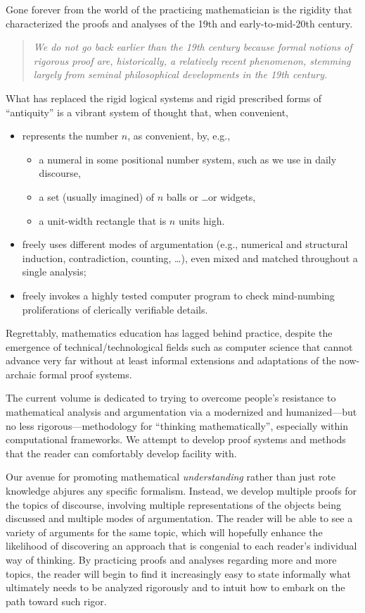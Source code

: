 Gone forever from the world of the practicing mathematician is the
rigidity that characterized the proofs and analyses of the 19th and
early-to-mid-20th century.
\begin{quote}
{\em We do not go back earlier than the 19th century because
formal notions of rigorous proof are, historically, a relatively
recent phenomenon, stemming largely from seminal philosophical
developments in the 19th century.}
\end{quote}
What has replaced the rigid logical systems and rigid prescribed forms
of ``antiquity'' is a vibrant system of thought that, when convenient,
\begin{itemize}
\item
represents the  number $n$, as convenient, by, e.g.,
  \begin{itemize}
  \item
a numeral in some positional number system, such as we use in daily
discourse,
  \item
a set (usually imagined) of $n$ balls or \ldots or widgets,
  \item
a unit-width rectangle that is $n$ units high.
  \end{itemize}

\item
freely uses different modes of argumentation (e.g., numerical and
structural induction, contradiction, counting, \ldots), even mixed and
matched throughout a single analysis;

\item
freely invokes a highly tested computer program to check mind-numbing
proliferations of clerically verifiable details.
\end{itemize}

Regrettably, mathematics education has lagged behind practice, despite
the emergence of technical/technological fields such as computer
science that cannot advance very far without at least informal
extensions and adaptations of the now-archaic formal proof systems.

The current volume is dedicated to trying to overcome people's
resistance to mathematical analysis and argumentation via a modernized
and humanized---but no less rigorous---methodology for ``thinking
mathematically'', especially within computational frameworks.  We
attempt to develop proof systems and methods that the reader can
comfortably develop facility with.

Our avenue for promoting mathematical {\em understanding} rather than
just rote knowledge abjures any specific formalism.  Instead, we
develop multiple proofs for the topics of discourse, involving
multiple representations of the objects being discussed and multiple
modes of argumentation.  The reader will be able to see a variety of
arguments for the same topic, which will hopefully enhance the
likelihood of discovering an approach that is congenial to each
reader's individual way of thinking.  By practicing proofs and
analyses regarding more and more topics, the reader will begin to find
it increasingly easy to state informally what ultimately needs to be
analyzed rigorously and to intuit how to embark on the path toward
such rigor.


